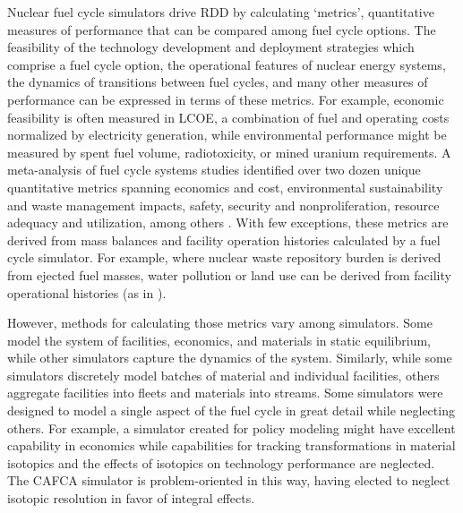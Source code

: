 

Nuclear fuel cycle simulators drive \gls{RDD} by calculating `metrics',
quantitative measures of performance that can be compared among fuel cycle
options.  The feasibility of the technology development and deployment
strategies which comprise a fuel cycle option, the operational features of
nuclear energy systems, the dynamics of transitions between fuel cycles, and
many other measures of performance can be expressed in terms of these metrics.
For example, economic feasibility is often measured in \gls{LCOE}, a
combination of fuel and operating costs normalized by electricity generation, while
environmental performance might be measured by spent fuel volume, radiotoxicity, or
mined uranium requirements. A meta-analysis of fuel cycle systems studies 
identified over
two dozen unique quantitative metrics spanning economics and cost,
environmental sustainability and waste management impacts, safety, security and
nonproliferation, resource adequacy and utilization, among others
\cite{flicker_evaluation_2014}. With few exceptions, these metrics are derived from
mass balances and facility operation histories calculated by a fuel cycle
simulator. For example, where nuclear waste repository burden is derived from
ejected fuel masses, water pollution or land use can be derived from facility
operational histories (as in \cite{poinssot_assessment_2014}).

However, methods for calculating those metrics vary among simulators. Some
model the system of facilities, economics, and materials in static equilibrium,
while other simulators capture the dynamics of the system.  Similarly, while
some simulators discretely model batches of material and individual facilities,
others aggregate facilities into fleets and materials into streams. Some
simulators were designed to model a single aspect of the fuel cycle in great
detail while neglecting others. For example, a simulator created for policy
modeling might have excellent capability in economics while capabilities for
tracking transformations in material isotopics and the effects of isotopics on
technology performance are neglected.  The \gls{CAFCA}\cite{guerin_impact_2009}
simulator is problem-oriented in this way, having elected to neglect isotopic
resolution in favor of integral effects.

